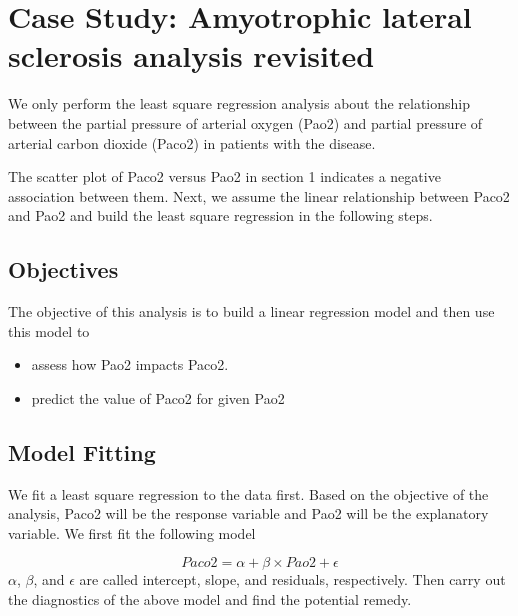 \documentclass[
]{book}
\begin{document}
\hypertarget{case-study-amyotrophic-lateral-sclerosis-analysis-revisited}{%
\section{Case Study: Amyotrophic lateral sclerosis analysis revisited}\label{case-study-amyotrophic-lateral-sclerosis-analysis-revisited}}

We only perform the least square regression analysis about the relationship between the partial
pressure of arterial oxygen (Pao2) and partial pressure of arterial carbon dioxide (Paco2) in patients with the disease.

The scatter plot of Paco2 versus Pao2 in section 1 indicates a negative association between them. Next, we assume the linear relationship between Paco2 and Pao2 and build the least square regression in the following steps.

\hypertarget{objectives}{%
\subsection{Objectives}\label{objectives}}

The objective of this analysis is to build a linear regression model and then use this model to

\begin{itemize}
\item
  assess how Pao2 impacts Paco2.
\item
  predict the value of Paco2 for given Pao2
\end{itemize}

\hypertarget{model-fitting}{%
\subsection{Model Fitting}\label{model-fitting}}

We fit a least square regression to the data first. Based on the objective of the analysis, Paco2 will be the response variable and Pao2 will be the explanatory variable. We first fit the following model

\[
Paco2 = \alpha + \beta \times Pao2 + \epsilon
\]
\(\alpha\), \(\beta\), and \(\epsilon\) are called intercept, slope, and residuals, respectively. Then carry out the diagnostics of the above model and find the potential remedy.
\end{document}
